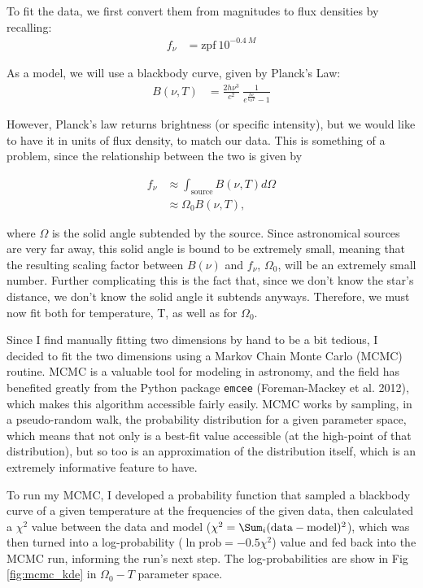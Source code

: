 \documentclass[12pt]{article}
\newenvironment{answer}[2][Answer]{\begin{trivlist}
\item[\hskip \labelsep {\bfseries #1}\hskip \labelsep {\bfseries #2.}]}{\end{trivlist}}
\begin{document}
\begin{answer}{2}
  To fit the data, we first convert them from magnitudes to flux densities by recalling:
  \begin{align*}
    f_\nu &= \text{zpf}\ 10^{-0.4\ M}
  \end{align*}

  As a model, we will use a blackbody curve, given by Planck's Law:
  \begin{align*}
    B(\nu, T) &= \frac{2h\nu^3}{c^2}\ \frac{1}{e^{\frac{h \nu}{k_B T}} - 1}
  \end{align*}

  However, Planck's law returns brightness (or specific intensity), but we would like to have it in units of flux density, to match our data. This is something of a problem, since the relationship between the two is given by

  \begin{align*}
    f_\nu &\approx \int_{\text{source}} B(\nu, T) d\Omega \\
          &\approx \Omega_0 B(\nu, T),
  \end{align*}

  where $\Omega$ is the solid angle subtended by the source. Since astronomical sources are very far away, this solid angle is bound to be extremely small, meaning that the resulting scaling factor between $B(\nu)$ and $f_\nu$, $\Omega_0$, will be an extremely small number. Further complicating this is the fact that, since we don't know the star's distance, we don't know the solid angle it subtends anyways. Therefore, we must now fit both for temperature, T, as well as for $\Omega_0$.

  Since I find manually fitting two dimensions by hand to be a bit tedious, I decided to fit the two dimensions using a Markov Chain Monte Carlo (MCMC) routine. MCMC is a valuable tool for modeling in astronomy, and the field has benefited greatly from the Python package \texttt{emcee} (Foreman-Mackey et al. 2012), which makes this algorithm accessible fairly easily. MCMC works by sampling, in a pseudo-random walk, the probability distribution for a given parameter space, which means that not only is a best-fit value accessible (at the high-point of that distribution), but so too is an approximation of the distribution itself, which is an extremely informative feature to have.

  To run my MCMC, I developed a probability function that sampled a blackbody curve of a given temperature at the frequencies of the given data, then calculated a $\chi^2$ value between the data and model ($\chi^2 = \Sum_i (\text{data} - \text{model})^2$), which was then turned into a log-probability ($\ln \text{prob} = -0.5 \chi^2$) value and fed back into the MCMC run, informing the run's next step. The log-probabilities are show in Fig \ref{fig:mcmc_kde} in $\Omega_0-T$ parameter space.



\end{answer}
\end{document}
